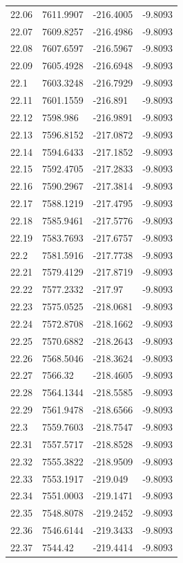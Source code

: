 \begin{table}[H]
\begin{tabular}{llll}
22.06 & 7611.9907 & -216.4005 & -9.8093 \\
22.07 & 7609.8257 & -216.4986 & -9.8093 \\
22.08 & 7607.6597 & -216.5967 & -9.8093 \\
22.09 & 7605.4928 & -216.6948 & -9.8093 \\
22.1 & 7603.3248 & -216.7929 & -9.8093 \\
22.11 & 7601.1559 & -216.891 & -9.8093 \\
22.12 & 7598.986 & -216.9891 & -9.8093 \\
22.13 & 7596.8152 & -217.0872 & -9.8093 \\
22.14 & 7594.6433 & -217.1852 & -9.8093 \\
22.15 & 7592.4705 & -217.2833 & -9.8093 \\
22.16 & 7590.2967 & -217.3814 & -9.8093 \\
22.17 & 7588.1219 & -217.4795 & -9.8093 \\
22.18 & 7585.9461 & -217.5776 & -9.8093 \\
22.19 & 7583.7693 & -217.6757 & -9.8093 \\
22.2 & 7581.5916 & -217.7738 & -9.8093 \\
22.21 & 7579.4129 & -217.8719 & -9.8093 \\
22.22 & 7577.2332 & -217.97 & -9.8093 \\
22.23 & 7575.0525 & -218.0681 & -9.8093 \\
22.24 & 7572.8708 & -218.1662 & -9.8093 \\
22.25 & 7570.6882 & -218.2643 & -9.8093 \\
22.26 & 7568.5046 & -218.3624 & -9.8093 \\
22.27 & 7566.32 & -218.4605 & -9.8093 \\
22.28 & 7564.1344 & -218.5585 & -9.8093 \\
22.29 & 7561.9478 & -218.6566 & -9.8093 \\
22.3 & 7559.7603 & -218.7547 & -9.8093 \\
22.31 & 7557.5717 & -218.8528 & -9.8093 \\
22.32 & 7555.3822 & -218.9509 & -9.8093 \\
22.33 & 7553.1917 & -219.049 & -9.8093 \\
22.34 & 7551.0003 & -219.1471 & -9.8093 \\
22.35 & 7548.8078 & -219.2452 & -9.8093 \\
22.36 & 7546.6144 & -219.3433 & -9.8093 \\
22.37 & 7544.42 & -219.4414 & -9.8093 \\

\end{tabular}
\end{table}
